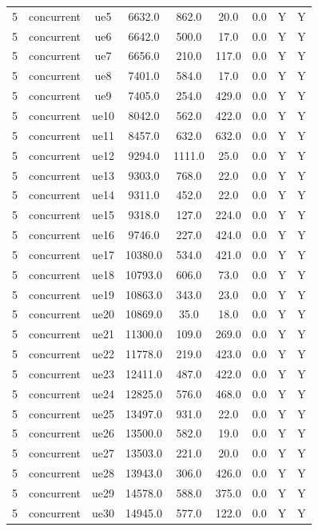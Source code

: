 \begin{table}[ht]
\begin{tabular}{|c|c|c|c|c|c|c|c|c|}
5 & concurrent & ue5 & 6632.0 & 862.0 & 20.0 & 0.0 & Y & Y \\
5 & concurrent & ue6 & 6642.0 & 500.0 & 17.0 & 0.0 & Y & Y \\
5 & concurrent & ue7 & 6656.0 & 210.0 & 117.0 & 0.0 & Y & Y \\
5 & concurrent & ue8 & 7401.0 & 584.0 & 17.0 & 0.0 & Y & Y \\
5 & concurrent & ue9 & 7405.0 & 254.0 & 429.0 & 0.0 & Y & Y \\
5 & concurrent & ue10 & 8042.0 & 562.0 & 422.0 & 0.0 & Y & Y \\
5 & concurrent & ue11 & 8457.0 & 632.0 & 632.0 & 0.0 & Y & Y \\
5 & concurrent & ue12 & 9294.0 & 1111.0 & 25.0 & 0.0 & Y & Y \\
5 & concurrent & ue13 & 9303.0 & 768.0 & 22.0 & 0.0 & Y & Y \\
5 & concurrent & ue14 & 9311.0 & 452.0 & 22.0 & 0.0 & Y & Y \\
5 & concurrent & ue15 & 9318.0 & 127.0 & 224.0 & 0.0 & Y & Y \\
5 & concurrent & ue16 & 9746.0 & 227.0 & 424.0 & 0.0 & Y & Y \\
5 & concurrent & ue17 & 10380.0 & 534.0 & 421.0 & 0.0 & Y & Y \\
5 & concurrent & ue18 & 10793.0 & 606.0 & 73.0 & 0.0 & Y & Y \\
5 & concurrent & ue19 & 10863.0 & 343.0 & 23.0 & 0.0 & Y & Y \\
5 & concurrent & ue20 & 10869.0 & 35.0 & 18.0 & 0.0 & Y & Y \\
5 & concurrent & ue21 & 11300.0 & 109.0 & 269.0 & 0.0 & Y & Y \\
5 & concurrent & ue22 & 11778.0 & 219.0 & 423.0 & 0.0 & Y & Y \\
5 & concurrent & ue23 & 12411.0 & 487.0 & 422.0 & 0.0 & Y & Y \\
5 & concurrent & ue24 & 12825.0 & 576.0 & 468.0 & 0.0 & Y & Y \\
5 & concurrent & ue25 & 13497.0 & 931.0 & 22.0 & 0.0 & Y & Y \\
5 & concurrent & ue26 & 13500.0 & 582.0 & 19.0 & 0.0 & Y & Y \\
5 & concurrent & ue27 & 13503.0 & 221.0 & 20.0 & 0.0 & Y & Y \\
5 & concurrent & ue28 & 13943.0 & 306.0 & 426.0 & 0.0 & Y & Y \\
5 & concurrent & ue29 & 14578.0 & 588.0 & 375.0 & 0.0 & Y & Y \\
5 & concurrent & ue30 & 14945.0 & 577.0 & 122.0 & 0.0 & Y & Y \\

\end{tabular}
\end{table}

